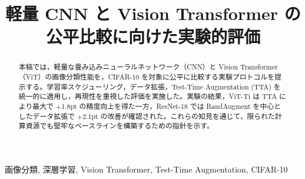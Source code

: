 \documentclass[conference]{IEEEtran}
\begin{document}
\title{軽量 CNN と Vision Transformer の公平比較に向けた実験的評価}

\author{
}

\maketitle

\begin{abstract}
本稿では，軽量な畳み込みニューラルネットワーク（CNN）と Vision Transformer（ViT）の画像分類性能を，CIFAR-10 を対象に公平に比較する実験プロトコルを提示する。学習率スケジューリング，データ拡張，Test-Time Augmentation (TTA) を統一的に適用し，再現性を重視した評価を実施した。実験の結果，ViT-Ti は TTA により最大で +1.8pt の精度向上を得た一方，ResNet-18 では RandAugment を中心としたデータ拡張で +2.1pt の改善が確認された。これらの知見を通じて，限られた計算資源でも堅牢なベースラインを構築するための指針を示す。
\end{abstract}

\begin{IEEEkeywords}
画像分類, 深層学習, Vision Transformer, Test-Time Augmentation, CIFAR-10
\end{IEEEkeywords}











\end{document}
